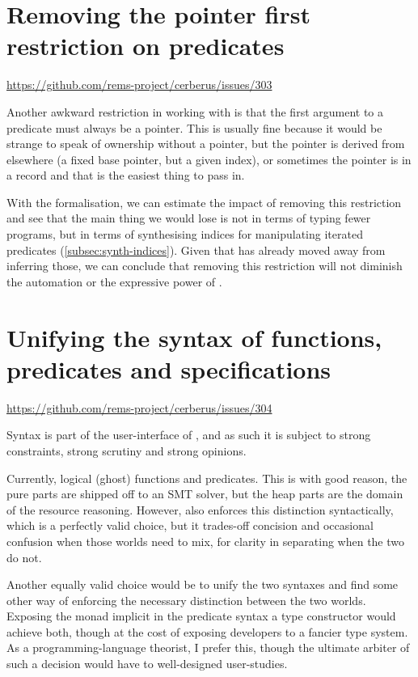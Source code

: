 \section{Removing the pointer first restriction on predicates}\label{sec:rm-ptr-first}
\url{https://github.com/rems-project/cerberus/issues/303}

Another awkward restriction in working with  is that the first argument
to a predicate must always be a pointer. This is usually fine because it would
be strange to speak of ownership without a pointer, but the pointer is derived
from elsewhere (a fixed base pointer, but a given index), or sometimes the
pointer is in a record and that is the easiest thing to pass in.

With the formalisation, we can estimate the impact of removing this restriction
and see that the main thing we would lose is not in terms of typing fewer
programs, but in terms of synthesising indices for manipulating iterated
predicates (\cref{subsec:synth-indices}). Given that  has already moved
away from inferring those, we can
conclude that removing this restriction will not diminish the automation or the
expressive power of .

\section{Unifying the syntax of functions, predicates and specifications}

\url{https://github.com/rems-project/cerberus/issues/304}

Syntax is part of the user-interface of , and as such it is subject to
strong constraints, strong scrutiny and strong opinions.

Currently, logical (ghost) functions and predicates. This is with good reason,
the pure parts are shipped off to an SMT solver, but the heap parts are the
domain of the resource reasoning. However,  also enforces this
distinction syntactically, which is a perfectly valid choice, but it trades-off
concision and occasional confusion when those worlds need to mix, for clarity
in separating when the two do not.

Another equally valid choice would be to unify the two syntaxes and find some
other way of enforcing the necessary distinction between the two worlds.
Exposing the monad implicit in the predicate syntax a type constructor would
achieve both, though at the cost of exposing developers to a fancier type
system. As a programming-language theorist, I prefer this, though the ultimate
arbiter of such a decision would have to well-designed user-studies.

